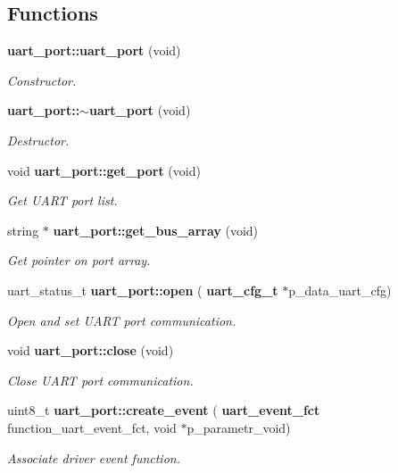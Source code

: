\subsection*{Functions}
\begin{DoxyCompactItemize}
\item 
\textbf{ uart\+\_\+port\+::uart\+\_\+port} (void)
\begin{DoxyCompactList}\small\item\em Constructor. \end{DoxyCompactList}\item 
\textbf{ uart\+\_\+port\+::$\sim$uart\+\_\+port} (void)
\begin{DoxyCompactList}\small\item\em Destructor. \end{DoxyCompactList}\item 
void \textbf{ uart\+\_\+port\+::get\+\_\+port} (void)
\begin{DoxyCompactList}\small\item\em Get U\+A\+RT port list. \end{DoxyCompactList}\item 
string $\ast$ \textbf{ uart\+\_\+port\+::get\+\_\+bus\+\_\+array} (void)
\begin{DoxyCompactList}\small\item\em Get pointer on port array. \end{DoxyCompactList}\item 
uart\+\_\+status\+\_\+t \textbf{ uart\+\_\+port\+::open} (\textbf{ uart\+\_\+cfg\+\_\+t} $\ast$p\+\_\+data\+\_\+uart\+\_\+cfg)
\begin{DoxyCompactList}\small\item\em Open and set U\+A\+RT port communication. \end{DoxyCompactList}\item 
void \textbf{ uart\+\_\+port\+::close} (void)
\begin{DoxyCompactList}\small\item\em Close U\+A\+RT port communication. \end{DoxyCompactList}\item 
uint8\+\_\+t \textbf{ uart\+\_\+port\+::create\+\_\+event} (\textbf{ uart\+\_\+event\+\_\+fct} function\+\_\+uart\+\_\+event\+\_\+fct, void $\ast$p\+\_\+parametr\+\_\+void)
\begin{DoxyCompactList}\small\item\em Associate driver event function. \end{DoxyCompactList}\item 

\end{DoxyCompactItemize}
